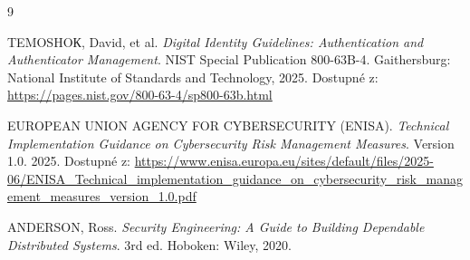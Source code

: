 \begin{thebibliography}{9}

TEMOSHOК, David, et al.
\textit{Digital Identity Guidelines: Authentication and Authenticator Management}.
NIST Special Publication 800-63B-4. Gaithersburg: National Institute of Standards and Technology, 2025.
Dostupné z: \url{https://pages.nist.gov/800-63-4/sp800-63b.html}

EUROPEAN UNION AGENCY FOR CYBERSECURITY (ENISA).
\textit{Technical Implementation Guidance on Cybersecurity Risk Management Measures}.
Version 1.0. 2025.
Dostupné z: \url{https://www.enisa.europa.eu/sites/default/files/2025-06/ENISA_Technical_implementation_guidance_on_cybersecurity_risk_management_measures_version_1.0.pdf}

ANDERSON, Ross.
\textit{Security Engineering: A Guide to Building Dependable Distributed Systems}.
3rd ed. Hoboken: Wiley, 2020.

\end{thebibliography}

